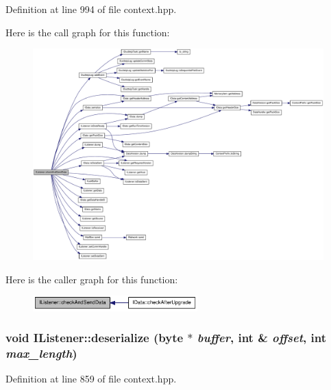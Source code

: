 Definition at line 994 of file context.hpp.

Here is the call graph for this function:\nopagebreak
\begin{figure}[H]
\begin{center}
\leavevmode
\includegraphics[width=420pt]{class_i_listener_a092fa85ce870bd169930cffce12bc87b_cgraph}
\end{center}
\end{figure}


Here is the caller graph for this function:\nopagebreak
\begin{figure}[H]
\begin{center}
\leavevmode
\includegraphics[width=180pt]{class_i_listener_a092fa85ce870bd169930cffce12bc87b_icgraph}
\end{center}
\end{figure}
\hypertarget{class_i_listener_a893f2f48814ce66437c6f2add51c8b8d}{
\subsubsection[{deserialize}]{\setlength{\rightskip}{0pt plus 5cm}void IListener::deserialize ({\bf byte} $\ast$ {\em buffer}, \/  int \& {\em offset}, \/  int {\em max\_\-length})}}
\label{class_i_listener_a893f2f48814ce66437c6f2add51c8b8d}


Definition at line 859 of file context.hpp.

